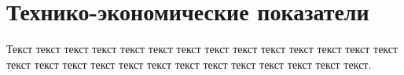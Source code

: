 \newpage\section{Технико-экономические показатели}\label{section:Технико-экономические показатели}

Текст текст текст текст текст текст текст текст текст текст текст текст текст текст текст текст текст текст текст текст текст текст текст текст текст текст текст.